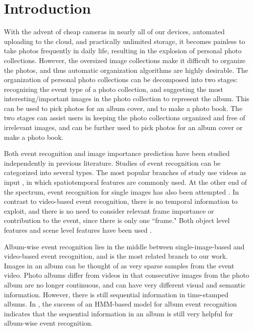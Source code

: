 \documentclass[runningheads]{llncs}
\begin{document}
\section{Introduction}
With the advent of cheap cameras in nearly all of our devices,  automated uploading to the cloud, and practically unlimited storage,
it becomes painless to take photos frequently in daily life, resulting in the explosion of personal photo collections. However, the oversized image collections make it difficult to organize the photos, and thus automatic organization algorithms are highly desirable. The organization of personal photo collections can be decomposed into two stages: recognizing the event type of a photo collection, and suggesting the most interesting/important images in the photo collection to represent the album. This can be used to pick photos for an album cover, and to make a photo book.  The two stages can assist users in keeping the photo collections organized and free of irrelevant images, and can be further used to pick photos for an album cover or make a photo book.

Both event recognition and image importance prediction have been studied independently in previous literature. Studies of event recognition can be categorized into several types. The most popular branches of study use videos as input \cite{2015trecvidover, TangCVPR12, xu2015discriminative}, in which spatiotemporal features are commonly used. 
At the other end of the spectrum, event recognition for single images has also been attempted \cite{what_where, Park_2015_CVPR_Workshops, cSalvadora}. In contrast to video-based event recognition, there is no temporal information to exploit, and there is no need to consider relevant frame importance or contribution to the event, since there is only one ``frame." Both object level features and scene level features have been used \cite{what_where}. 

Album-wise event recognition lies in the middle between single-image-based and video-based event recognition, and is the most related branch to our work. Images in an album can be thought of as very sparse samples from the event video. Photo albums differ from videos in that consecutive images from the photo album are no longer continuous, and can have very different visual and semantic information. However, there is still sequential information in time-stamped albums. In \cite{HMM}, the success of an HMM-based model for album event recognition indicates that the sequential information in an album is still very helpful for  album-wise event recognition.
\end{document}
